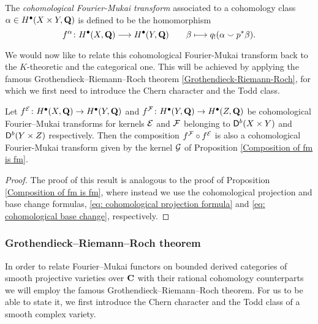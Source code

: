 \begin{definition}
    The \emph{cohomological Fourier-Mukai transform} associated to a cohomology class $\alpha \in H^{\bullet}(X \times Y, \mathbf Q)$ is defined to be the homomorphism
    \[
        f^\alpha \colon H^{\bullet}(X, \mathbf Q) \longrightarrow H^{\bullet}(Y, \mathbf Q) \qquad \beta \longmapsto q_!(\alpha \smallsmile p^*\beta).
    \]
\end{definition}

We would now like to relate this cohomological Fourier-Mukai transform back to the $K$-theoretic and the categorical one. This will be achieved by applying the famous Grothendieck--Riemann--Roch theorem \ref{Grothendieck-Riemann-Roch}, for which we first need to introduce the Chern character and the Todd class. 

\begin{proposition}
    \label{Composition of cohomological fm is fm}
    Let $f^{\mathcal E} \colon H^\bullet(X, \mathbf Q) \to H^\bullet(Y, \mathbf Q)$ and $f^{\mathcal F} \colon H^\bullet(Y, \mathbf Q) \to H^\bullet(Z, \mathbf Q)$ be cohomological Fourier--Mukai transforms for kernels $\mathcal E$ and $\mathcal F$ belonging to $\mathsf{D}^b(X \times Y)$ and $\mathsf{D}^b(Y \times Z)$ respectively. Then the composition $f^{\mathcal F} \circ f^{\mathcal E}$ is also a cohomological Fourier-Mukai transform given by the kernel $\mathcal G$ of Proposition \ref{Composition of fm is fm}.
\end{proposition}

\begin{proof}
    The proof of this result is analogous to the proof of Proposition \ref{Composition of fm is fm}, where instead we use the cohomological projection and base change formulas, \eqref{eq: cohomological projection formula} and \eqref{eq: cohomological base change}, respectively.
\end{proof}

\subsubsection*{Grothendieck--Riemann--Roch theorem}

In order to relate Fourier--Mukai functors on bounded derived categories of smooth projective varieties over $\mathbf C$ with their rational cohomology counterparts we will employ the famous Grothendieck--Riemann--Roch theorem. For us to be able to state it, we first introduce the Chern character and the Todd class of a smooth complex variety.

